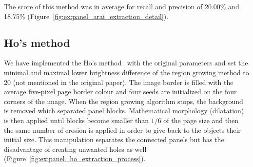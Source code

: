The score of this method was in average for recall and precision of 20.00\% and 18.75\% (Figure~\ref{fig:ex:panel_arai_extraction_detail}).




\subsection{Ho's method} %
We have implemented the Ho's method~\cite{Ho2012} with the original parameters and set the minimal and maximal lower brightness difference of the region growing method to 20 (not mentioned in the original paper).
The image border is filled with the average five-pixel page border colour and four seeds are initialized on the four corners of the image.
When the region growing algorithm stops, the background is removed which separated panel blocks.
Mathematical morphology (dilatation) is then applied until blocks become smaller than $1/6$ of the page size and then the same number of erosion is applied in order to give back to the objects their initial size.
This manipulation separates the connected panels but has the disadvantage of creating unwanted holes as well (Figure~\ref{fig:ex:panel_ho_extraction_process}).

